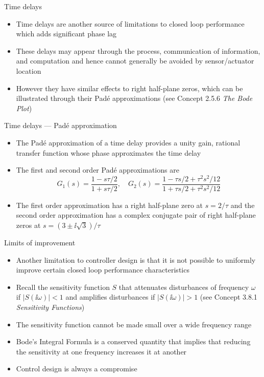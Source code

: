 \documentclass[10pt]{beamer-control}
\begin{document}
\begin{frame}{Time delays}
	\begin{itemize}
		\item Time delays are another source of limitations to closed loop performance which adds significant phase lag
		\item These delays may appear through the process, communication of information, and computation and hence cannot generally be avoided by sensor/actuator location
		\item However they have similar effects to right half-plane zeros, which can be illustrated through their Pad\'{e} approximations (see Concept 2.5.6 \emph{The Bode Plot})
	\end{itemize}
\end{frame}


\begin{frame}{Time delays --- Pad\'{e} approximation}
  \begin{itemize}
    \item The Pad\'{e} approximation of a time delay provides a unity gain, rational transfer function whose phase approximates the time delay
    \item The first and second order Pad\'{e} approximations are
      \begin{equation}
        G_1(s)=\frac{1-s\tau/2}{1+s\tau/2}, \quad G_2(s)=\frac{1-\tau s/2 + \tau^2 s^2/12}{1+\tau s/2 + \tau^2 s^2/12}
      \end{equation}
    \item The first order approximation has a right half-plane zero at $s=2/\tau$ and the second order approximation has a complex conjugate pair of right half-plane zeros at $s=(3\pm \ii\sqrt{3})/\tau$
  \end{itemize}
\end{frame}



\begin{frame}{Limits of improvement}
\begin{itemize}
	\item Another limitation to controller design is that it is not possible to uniformly improve certain closed loop performance characteristics
	\item Recall the sensitivity function $S$ that attenuates disturbances of frequency $\omega$ if $|S(\ii\omega)|<1$ and amplifies disturbances if $|S(\ii\omega)|>1$ (see Concept 3.8.1 \emph{Sensitivity Functions})
	\item The sensitivity function cannot be made small over a wide frequency range
	\item Bode's Integral Formula is a conserved quantity that implies that reducing the sensitivity at one frequency increases it at another
	\item Control design is always a compromise
\end{itemize}
\end{frame}
\end{document}
